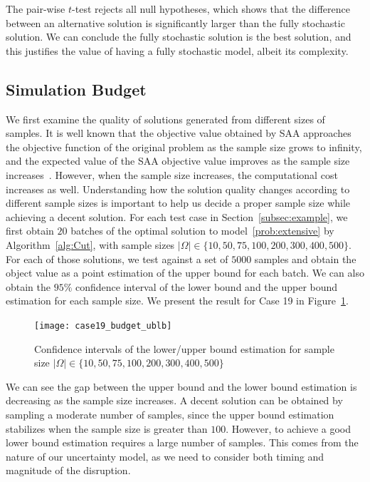 \documentclass[11pt]{article}
\begin{document}
	The pair-wise \(t\)-test rejects all null hypotheses, which shows that the difference between an alternative solution is significantly larger than the fully stochastic solution. We can conclude the fully stochastic solution is the best solution, and this justifies the value of having a fully stochastic model, albeit its complexity.
	\subsection{Simulation Budget} \label{subsec:budget}
	We first examine the quality of solutions generated from different sizes of samples. It is well known that the objective value obtained by SAA approaches the objective function of the original problem as the sample size grows to infinity, and the expected value of the SAA objective value improves as the sample size increases~\cite{shapiro2009lectures}. However, when the sample size increases, the computational cost increases as well. Understanding how the solution quality changes according to different sample sizes is important to help us decide a proper sample size while achieving a decent solution. For each test case in Section~\ref{subsec:example}, we first obtain \(20\) batches of the optimal solution to model~\ref{prob:extensive} by Algorithm~\ref{alg:Cut}, with sample sizes \(|\Omega| \in \{10, 50, 75, 100, 200, 300, 400, 500\}\). For each of those solutions, we test against a set of \(5000\) samples and obtain the object value as a point estimation of the upper bound for each batch. We can also obtain the \(95\%\) confidence interval of the lower bound and the upper bound estimation for each sample size. We present the result for Case 19 in Figure~\ref{fig:budget}.
	\begin{figure}[H]
		\centering
		\texttt{[image: case19\_budget\_ublb]}
		\caption{Confidence intervals of the lower/upper bound estimation for sample size \(|\Omega| \in \{10, 50, 75, 100, 200, 300, 400, 500\}\)}
		\label{fig:budget}
	\end{figure}
	We can see the gap between the upper bound and the lower bound estimation is decreasing as the sample size increases. A decent solution can be obtained by sampling a moderate number of samples, since the upper bound estimation stabilizes when the sample size is greater than \(100\). However, to achieve a good lower bound estimation requires a large number of samples. This comes from the nature of our uncertainty model, as we need to consider both timing and magnitude of the disruption. 
\end{document}

